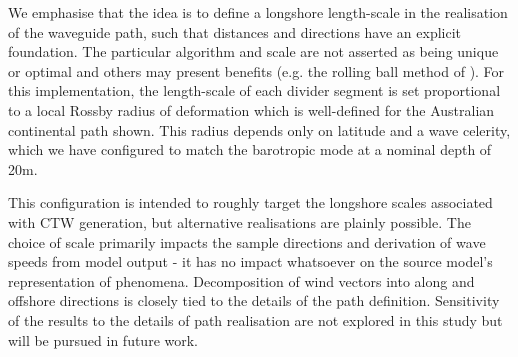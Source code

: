We emphasise that the idea is to define a longshore length-scale in the realisation of the waveguide path, such that distances and directions have an explicit foundation.
The particular algorithm and scale are not asserted as being unique or optimal and others may present benefits (e.g. the rolling ball method of \citet{Hall:2002bo}).
For this implementation, the length-scale of each divider segment is set proportional to a local Rossby radius of deformation \citep[p.205]{gill1982atmosphere} which is well-defined for the Australian continental path shown.   
This radius depends only on latitude and a wave celerity, which we have configured to match the barotropic mode at a nominal depth of 20m.

This configuration is intended to roughly target the longshore scales associated with CTW generation, but alternative realisations are plainly possible.
The choice of scale primarily impacts the sample directions and derivation of wave speeds from model output - it has no impact whatsoever on the source model's representation of phenomena.
Decomposition of wind vectors into along and offshore directions is closely tied to the details of the path definition.
Sensitivity of the results to the details of path realisation are not explored in this study but will be pursued in future work.      



